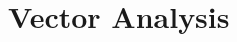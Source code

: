 \documentclass[a4paper]{memoir}
\begin{document}
\chapter{Vector Analysis}
\lipsum[1-3]
\end{document}
